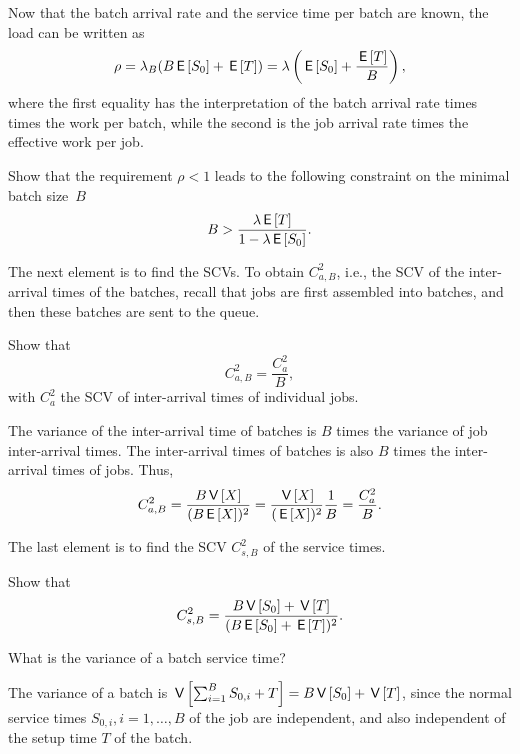 Now that  the batch arrival rate and the service time per batch are known, the load can be written as
\begin{equation*}
\rho = \lambda_B (B \,\mathsf{E}\left[S_0\right] + \,\mathsf{E}\left[T\right]) = \lambda \left(\,\mathsf{E}\left[S_0\right] + \frac{\,\mathsf{E}\left[T\right]}B\right),
\end{equation*}
where the first equality has the interpretation of the batch arrival rate times times the work per batch, while the second is the job arrival rate times the effective work per job. 

\begin{exercise} 
Show that the requirement $\rho < 1$ leads to the following constraint on the minimal batch size~$B$ 
  \begin{equation*}
 B>\frac{\lambda \,\mathsf{E}\left[T\right]}{1-\lambda \,\mathsf{E}\left[S_0\right]}.
  \end{equation*}
\end{exercise}

The next element is to find the SCVs. To obtain $C_{a,B}^2$, i.e., the SCV of the inter-arrival times of the batches, recall that jobs are first assembled into batches, and then these batches are sent to the queue.

\begin{exercise}
 Show that 
 \begin{equation*}
C_{a,B}^2 = \frac{C_{a}^2}B,
 \end{equation*}
with $C_a^2$ the SCV of inter-arrival times of individual jobs.
  \begin{solution}
The variance of the inter-arrival time of batches is $B$ times the variance of job inter-arrival times. The inter-arrival times of batches is also $B$ times the inter-arrival times of jobs. Thus, 
\begin{equation*}
  C_{a,B}^2 = \frac{B \,\mathsf{V}\left[X\right]}{(B \,\mathsf{E}\left[X\right])^2} = \frac{\,\mathsf{V}\left[X\right]}{(\,\mathsf{E}\left[X\right])^2} \frac 1 B =  \frac{C_a^2}{B}.
\end{equation*}
  \end{solution}
\end{exercise}

The last element is to find the SCV $C_{s,B}^2$ of the service times.

\begin{exercise}
Show that
\begin{equation*}
C_{s, B}^2 = \frac{B \,\mathsf{V}\left[S_0\right] + \,\mathsf{V}\left[T\right]}{(B \,\mathsf{E}\left[S_0\right] + \,\mathsf{E}\left[T\right])^2}.
\end{equation*}
\begin{hint}
  What is the variance of a batch service time?
\end{hint}
\begin{solution}
  The variance of a batch is $\,\mathsf{V}\left[\sum_{i=1}^B S_{0,i} + T\right] = B\,\mathsf{V}\left[S_0\right] + \,\mathsf{V}\left[T\right]$, since the normal service times $S_{0,i}, i=1,\ldots, B$ of the job are independent, and also independent of the setup time $T$  of the batch.
\end{solution}
\end{exercise}



